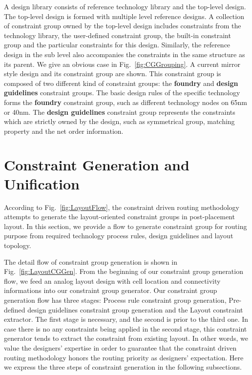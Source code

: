     A design library consists of reference technology library and the top-level design. The top-level design is formed with multiple level reference designs. A collection of constraint group owned by the top-level design includes constraints from the technology library, the user-defined constraint group, the built-in constraint group and the particular constraints for this design. Similarly, the reference design in the sub level also accompanies the constraints in the same structure as its parent. We give an obvious case in Fig.~\ref{fig:CGGrouping}. A current mirror style design and its constraint group are shown. This constraint group is composed of two different kind of constraint groups: the {\bf foundry} and {\bf design guidelines} constraint groups. The basic design rules of the specific technology forms the {\bf foundry} constraint group, such as different technology nodes on  65nm or 40nm. The {\bf design guidelines} constraint group represents the constraints which are strictly owned by the design, such as symmetrical group, matching property and the net order information.

  \section{Constraint Generation and Unification}\label{sec:ConGenUni}

    According to Fig.~\ref{fig:LayoutFlow}, the constraint driven routing methodology attempts to generate the layout-oriented constraint groups in post-placement layout. In this section, we provide a flow to generate constraint group for routing purpose from required technology process rules, design guidelines and layout topology. 
  
    The detail flow of constraint group generation is shown in Fig.~\ref{fig:LayoutCGGen}. From the beginning of our constraint group generation flow, we feed an analog layout design with cell location and connectivity informations into our constraint group generator. Our constraint group generation flow has three stages: Process rule constraint group generation, Pre-defined design guidelines constraint group generation and the Layout constraint extractor. The first stage is necessary, and the second is prior to the third one. In case there is no any constraints being applied in the second stage, this constraint generator tends to extract the constraint from existing layout. In other words, we value the designers' expertise in order to guarantee that the constraint driven routing methodology honors the routing priority as designers' expectation. Here we express the three steps of constraint generation in the following subsections. 
    

